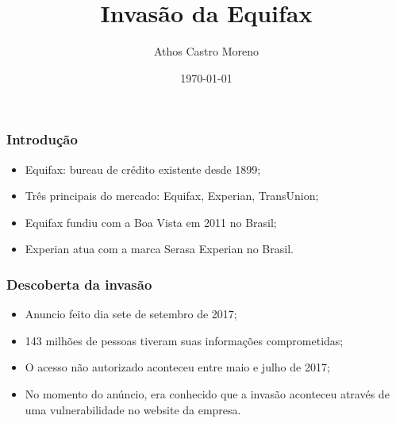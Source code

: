 \documentclass{beamer}
\title{Invasão da Equifax}
\author[Athos Castro Moreno]{Athos Castro Moreno}
\institute{Universidade Tecnológica Federal do Paraná}
\date{\today}
\begin{document}
	\begin{frame}
		\titlepage
	\end{frame}
	\begin{frame}
		\frametitle{Introdução}
		\begin{itemize}
			\item Equifax: bureau de crédito existente desde 1899;
			\item Três principais do mercado: Equifax, Experian, TransUnion;
			\item Equifax fundiu com a Boa Vista em 2011 no Brasil;
			\item Experian atua com a marca Serasa Experian no Brasil. 
		\end{itemize}
	\end{frame}
	\begin{frame}
		\frametitle{Descoberta da invasão}
		\begin{itemize}
			\item Anuncio feito dia sete de setembro de 2017;
			\item 143 milhões de pessoas tiveram suas informações comprometidas;
			\item O acesso não autorizado aconteceu entre maio e julho de 2017;
			\item No momento do anúncio, era conhecido que a invasão aconteceu através de uma vulnerabilidade no website da empresa.
		\end{itemize}
	\end{frame}
	\begin{frame}
		\titlepage
	\end{frame}
\end{document}
